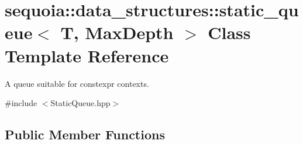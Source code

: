 \hypertarget{classsequoia_1_1data__structures_1_1static__queue}{}\section{sequoia\+::data\+\_\+structures\+::static\+\_\+queue$<$ T, Max\+Depth $>$ Class Template Reference}
\label{classsequoia_1_1data__structures_1_1static__queue}


A queue suitable for constexpr contexts.  




{\ttfamily \#include $<$Static\+Queue.\+hpp$>$}

\subsection*{Public Member Functions}
